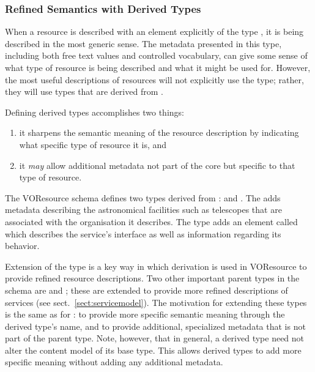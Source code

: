\documentclass[11pt,a4paper]{ivoa}
\begin{document}
\subsubsection{Refined Semantics with Derived Types}
\label{sect:derivedtypes}

When a resource is described with an element explicitly of the type
, it is being described in the most generic
sense.  The metadata presented in this type, including both free text
values and controlled vocabulary, can give some sense of what
type of resource is being described and what it might be used for.
However, the most useful descriptions of resources will not explicitly
use the  type; rather, they will use types
that are derived from .



Defining derived  types accomplishes two
things:
\begin{enumerate}
  \item it sharpens the semantic meaning of the resource description by
       indicating what specific type of resource it is, and
  \item it \emph{may} allow additional metadata not part of the core
       but specific to that type of resource.
\end{enumerate}



The VOResource schema defines two types derived from
:   and
.   The  adds
metadata describing the astronomical facilities such as telescopes
that are associated with the organisation it describes.  The
 type adds an element called
 which describes the service's interface as
well as information regarding its behavior.



Extension of the  type is a key way in which
derivation is used in VOResource to provide refined resource
descriptions.  Two other important parent types in the schema are
 and ; these are
extended to provide more refined descriptions of services (see
sect.~\ref{sect:servicemodel}).  The motivation for extending
these types is the same as for : to provide
more specific semantic meaning through the derived type's name, and to
provide additional, specialized metadata that is not part of the
parent type.  Note, however, that in general, a derived type need not
alter the content model of its base type.  This allows derived types
to add more specific meaning without adding any additional metadata.
\end{document}
